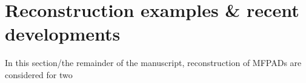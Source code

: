 \section{Reconstruction examples & recent developments}

In this section/the remainder of the manuscript, reconstruction of MFPADs are considered for two 